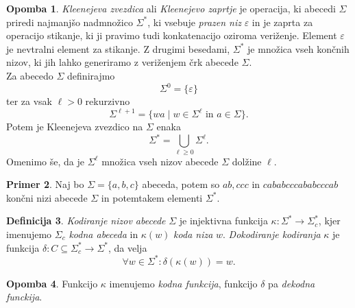 \documentclass{amsart}
\theoremstyle{definition}
\newtheorem{definicija}{Definicija}[section]
\newtheorem{primer}[definicija]{Primer}
\newtheorem{opomba}[definicija]{Opomba}
\theoremstyle{plain} %
\begin{document}
\begin{opomba}
    
    \textit{Kleenejeva zvezdica} ali \textit{Kleenejevo zaprtje} je operacija, ki
    abecedi $ \Sigma $ priredi najmanjšo nadmnožico $ \Sigma^* $, ki vsebuje
    \textit{prazen niz} $ \varepsilon $ in je zaprta za operacijo stikanje, ki ji
    pravimo tudi konkatenacijo oziroma veriženje. Element $ \varepsilon $ je
    nevtralni element za stikanje. Z drugimi besedami, $ \Sigma^* $ je množica vseh
    končnih nizov, ki jih lahko generiramo z veriženjem črk abecede $ \Sigma $. \\
    Za abecedo $ \Sigma $ definirajmo
    \[
        \Sigma^0 = \{ \varepsilon \}
    \]
    ter za vsak $ \ell > 0 $ rekurzivno
    \[
        \Sigma^{\ell+1} = \{ wa \mid w \in \Sigma^{\ell} \text{ in } a \in \Sigma \}.
    \]
    Potem je Kleenejeva zvezdico na $ \Sigma $ enaka
    \[
        \Sigma^* = \bigcup_{\ell \geq 0} \Sigma^\ell.
    \]
    Omenimo še, da je $ \Sigma^{\ell} $ množica vseh nizov abecede $ \Sigma $ dolžine $ \ell $.

\end{opomba}

\begin{primer}
    
    Naj bo $ \Sigma = \{ a,b,c \} $ abeceda, potem so $ \mathit{ab}, \mathit{ccc} \text{ in }
    \mathit{cababcccababcccab} $ končni nizi abecede $ \Sigma $ in potemtakem elementi $ \Sigma^* $.

\end{primer}

\begin{definicija}
    
    \textit{Kodiranje nizov abecede} $ \Sigma $ je injektivna funkcija $ \kappa \colon \Sigma^* 
    \to \Sigma_c^* $, kjer imenujemo $ \Sigma_c $ \textit{kodna abeceda} in $ \kappa(w) $ 
    \textit{koda niza} $ w $. \textit{Dokodiranje kodiranja} $ \kappa $ je funkcija 
    $ \delta \colon C \subseteq \Sigma^*_c \to \Sigma^* $, da velja
    \[
        \forall w \in \Sigma^* \colon \delta(\kappa(w)) = w.
    \]

\end{definicija}

\begin{opomba}
    
    Funkcijo $ \kappa $ imenujemo \textit{kodna funkcija}, funkcijo $ \delta $ pa
    \textit{dekodna funckija}.

\end{opomba}
\end{document}
